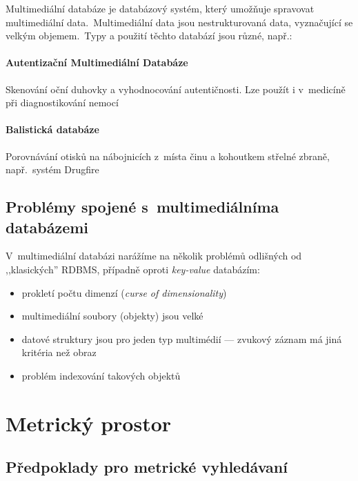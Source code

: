 Multimediální databáze je databázový systém, který umožňuje spravovat
multimediální data\@.~Multimediální data jsou nestrukturovaná data,
vyznačující se velkým objemem\@.~Typy a použití těchto databází
jsou různé, např.:


\paragraph{Autentizační Multimediální Databáze}

Skenování oční duhovky a vyhodnocování autentičnosti\@. Lze použít
i v~medicíně při diagnostikování nemocí


\paragraph{Balistická databáze }

Porovnávání otisků na nábojnicích z~místa činu a kohoutkem střelné
zbraně, např.~systém Drugfire\cite{drugfire}




\subsection{Problémy spojené s~multimediálníma databázemi}

V~multimediální databázi narážíme na několik problémů odlišných od
,,klasických'' RDBMS, případně oproti \emph{key-value }databázím\cite{no-sql}:
\begin{itemize}
\item prokletí počtu dimenzí (\emph{curse of dimensionality})\cite{Bellman195706}
\item multimediální soubory (objekty) jsou velké
\item datové struktury jsou pro jeden typ multimédií --- zvukový záznam
má jiná kritéria než obraz
\item problém indexování takových objektů
\end{itemize}

\section{Metrický prostor}


\subsection{Předpoklady pro metrické vyhledávaní}

